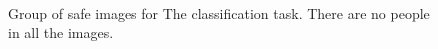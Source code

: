 \begin{figure}
    \\
    \vspace{\subfigurevspacing}
    \hspace{\subfigurehspacing}
    \vspace{0.1cm}
    \caption[Group of safe images for The classification task]
    {Group of safe images for The classification task. There are no people in all the images.}
    \label{fig:sub_dangerous_group}
\end{figure}
